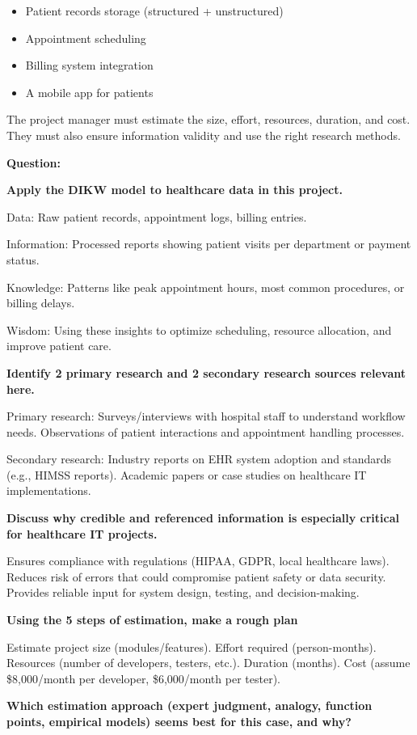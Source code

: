 \begin{itemize}
    \item Patient records storage (structured + unstructured)
    \item Appointment scheduling
    \item Billing system integration
    \item A mobile app for patients
\end{itemize}

The project manager must estimate the size, effort, resources, duration, and cost. They must also ensure information validity and use the right research methods.

\bigskip

\noindent\textbf{Question:}

\bigskip

\noindent\textbf{Apply the DIKW model to healthcare data in this project.}

Data: Raw patient records, appointment logs, billing entries.

Information: Processed reports showing patient visits per department or payment status.

Knowledge: Patterns like peak appointment hours, most common procedures, or billing delays.

Wisdom: Using these insights to optimize scheduling, resource allocation, and improve patient care.

\bigskip

\noindent\textbf{Identify 2 primary research and 2 secondary research sources relevant here.}

Primary research: Surveys/interviews with hospital staff to understand workflow needs. Observations of patient interactions and appointment handling processes.

Secondary research: Industry reports on EHR system adoption and standards (e.g., HIMSS reports). Academic papers or case studies on healthcare IT implementations.


\bigskip

\noindent\textbf{Discuss why credible and referenced information is especially critical for healthcare IT projects.}


Ensures compliance with regulations (HIPAA, GDPR, local healthcare laws). Reduces risk of errors that could compromise patient safety or data security. Provides reliable input for system design, testing, and decision-making.

\bigskip

\noindent\textbf{Using the 5 steps of estimation, make a rough plan}


\step Estimate project size (modules/features).
\step Effort required (person-months).
\step Resources (number of developers, testers, etc.).
\step Duration (months).
\step Cost (assume \$8,000/month per developer, \$6,000/month per tester).


\bigskip

\noindent\textbf{Which estimation approach (expert judgment, analogy, function points, empirical models) seems best for this case, and why?}
